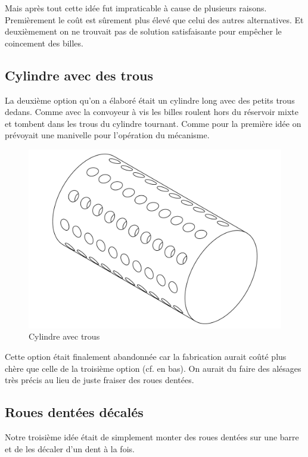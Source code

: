 Mais après tout cette idée fut impraticable à cause de plusieurs raisons. Premièrement le coût est sûrement plus élevé que celui des autres alternatives. Et deuxièmement on ne trouvait pas de solution satisfaisante pour empêcher le coincement des billes.

\subsection{Cylindre avec des trous}
La deuxième option qu'on a élaboré était un cylindre long avec des petits trous dedans. Comme avec la convoyeur à vis les billes roulent hors du réservoir mixte et tombent dans les trous du cylindre tournant. Comme pour la première idée on prévoyait une manivelle pour l'opération du mécanisme.

\begin{figure}
    \centering
    \includegraphics[width=\textwidth]{Graphics/Roue/DRAWING_PROTOTYP_CYLINDRE.pdf}
    \caption{Cylindre avec trous}
\end{figure}

Cette option était finalement abandonnée car la fabrication aurait coûté plus chère que celle de la troisième option (cf. en bas). On aurait du faire des alésages très précis au lieu de juste fraiser des roues dentées.

\subsection{Roues dentées décalés}
Notre troisième idée était de simplement monter des roues dentées sur une barre et de les décaler d'un dent à la fois.


